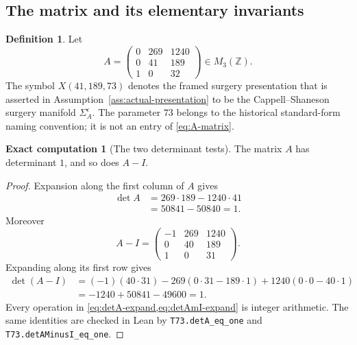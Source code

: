 \documentclass[10pt,reqno]{amsart}
\theoremstyle{definition}
\newtheorem{definition}[theorem]{Definition}
\newtheorem{computation}[theorem]{Exact computation}
\theoremstyle{remark}
\newcommand{\Z}{\mathbb Z}
\begin{document}
\subsection{The matrix and its elementary invariants}

\begin{definition}\label{def:A}
Let
\begin{equation}\label{eq:A-matrix}
A=
\begin{pmatrix}
0&269&1240\\
0&41&189\\
1&0&32
\end{pmatrix}
\in M_3(\Z).
\end{equation}
The symbol $X(41,189,73)$ denotes the framed surgery presentation that is
asserted in Assumption~\ref{ass:actual-presentation} to be the
Cappell--Shaneson surgery manifold $\Sigma_A^\epsilon$.  The parameter $73$
belongs to the historical standard-form naming convention; it is not an
entry of \cref{eq:A-matrix}.
\end{definition}

\begin{computation}[The two determinant tests]\label{comp:determinants}
The matrix $A$ has determinant $1$, and so does $A-I$.
\end{computation}

\begin{proof}
Expansion along the first column of $A$ gives
\begin{align}
\det A
 &=269\cdot189-1240\cdot41 \label{eq:detA-expand}\\
 &=50841-50840=1. \label{eq:detA-value}
\end{align}
Moreover
\begin{equation}\label{eq:A-minus-I}
A-I=
\begin{pmatrix}
-1&269&1240\\
0&40&189\\
1&0&31
\end{pmatrix}.
\end{equation}
Expanding along its first row gives
\begin{align}
\det(A-I)
 &=(-1)(40\cdot31)-269(0\cdot31-189\cdot1)
   +1240(0\cdot0-40\cdot1) \label{eq:detAmI-expand}\\
 &=-1240+50841-49600=1. \label{eq:detAmI-value}
\end{align}
Every operation in \cref{eq:detA-expand,eq:detAmI-expand} is integer
arithmetic.  The same identities are checked in Lean by
\texttt{T73.detA\_eq\_one} and
\texttt{T73.detAMinusI\_eq\_one}.
\end{proof}
\end{document}
